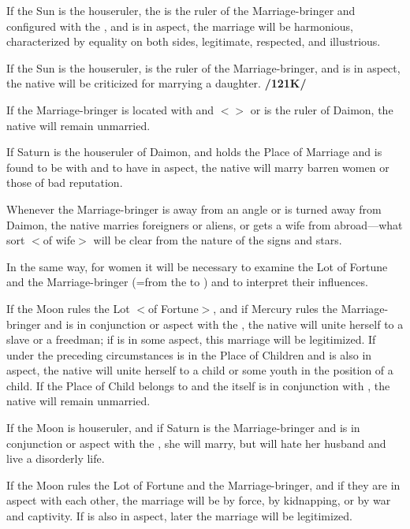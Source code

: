 If the Sun is the houseruler, the \Moon\xspace is the ruler of the Marriage-bringer and configured with the \Sun, and \Jupiter\xspace is in aspect, the marriage will be harmonious, characterized by equality on both sides, legitimate, respected, and illustrious. 

If the Sun is the houseruler, \Venus\xspace is the
ruler of the Marriage-bringer, and \Saturn\xspace is in aspect, the native will be criticized for marrying a daughter. \textbf{/121K/} 

If the Marriage-bringer is located with \Saturn\xspace and $<$\Saturn$>$ or \Mars\xspace is the ruler of Daimon, the native will remain unmarried. 

If Saturn is the houseruler of Daimon, and \Venus\xspace holds the Place of Marriage and is found to be with \Mercury\xspace and to have \Mars\xspace in aspect, the native will marry barren women or those of bad reputation. 

Whenever the Marriage-bringer is away from an angle or is turned away from Daimon, the native marries foreigners or aliens, or gets a wife from abroad—what sort $<$of wife$>$ will be clear from the nature of the signs and stars.

In the same way, for women it will be necessary to examine the Lot of Fortune and the Marriage-bringer (=from the \Moon\xspace to \Mars) and to interpret their influences. 

If the Moon rules the Lot $<$of Fortune$>$, and if Mercury rules the Marriage-bringer and is in conjunction or aspect with the \Moon, the native will unite herself to a slave or a freedman; if \Jupiter\xspace is in some aspect, this marriage will be legitimized. If under the preceding circumstances \Jupiter\xspace is in the Place of Children and \Saturn\xspace is also in aspect, the native
will unite herself to a child or some youth in the position of a child. If the Place of Child belongs to \Saturn\xspace and the \Moon\xspace itself is in conjunction with \Saturn, the native will remain unmarried. 

If the Moon is houseruler, and if Saturn is the Marriage-bringer and is in conjunction or aspect with the \Moon, she will marry, but will hate her husband and live a disorderly life. 

If the Moon rules the Lot of Fortune and \Mars\xspace
the Marriage-bringer, and if they are in aspect with each other, the marriage will be by force, by kidnapping, or by war and captivity. If \Jupiter\xspace is also in aspect, later the marriage will be legitimized. 


